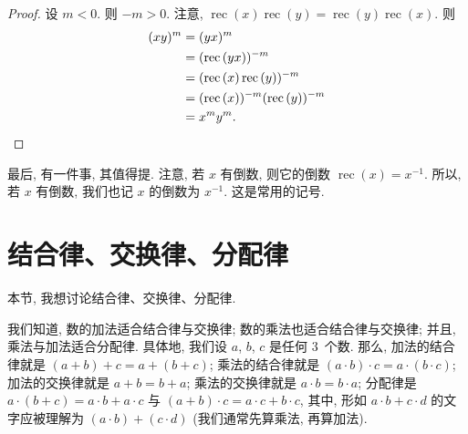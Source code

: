 \documentclass[../libro.tex]{subfiles}
\begin{document}
\begin{proof}
    设 \(m < 0\).
    则 \(-m > 0\).
    注意,
    \(\operatorname{rec} {(x)} \operatorname{rec} {(y)}
    = \operatorname{rec} {(y)} \operatorname{rec} {(x)}\).
    则
    \begin{align*}
        (x y)^m
        = {} &
        (y x)^m
        \\
        = {} &
        (\operatorname{rec} {(y x)})^{-m}
        \\
        = {} &
        (\operatorname{rec} {(x)} \operatorname{rec} {(y)})^{-m}
        \\
        = {} &
        (\operatorname{rec} {(x)})^{-m} (\operatorname{rec} {(y)})^{-m}
        \\
        = {} &
        x^m y^m.
        \qedhere
    \end{align*}
\end{proof}

最后, 有一件事, 其值得提.
注意, 若 \(x\) 有倒数, 则它的倒数
\(\operatorname{rec} {(x)} = x^{-1}\).
所以, 若 \(x\) 有倒数,
我们也记 \(x\) 的倒数为 \(x^{-1}\).
这是常用的记号.

\section{结合律、交换律、分配律}

本节, 我想讨论结合律、交换律、分配律.

我们知道, 数的加法适合结合律与交换律;
数的乘法也适合结合律与交换律;
并且, 乘法与加法适合分配律.
具体地, 我们设 \(a\), \(b\), \(c\) 是任何 \(3\)~个数.
那么, 加法的结合律就是 \((a + b) + c = a + (b + c)\);
乘法的结合律就是 \((a \cdot b) \cdot c = a \cdot (b \cdot c)\);
加法的交换律就是 \(a + b = b + a\);
乘法的交换律就是 \(a \cdot b = b \cdot a\);
分配律是
\(a \cdot (b + c) = a \cdot b + a \cdot c\)
与
\((a + b) \cdot c = a \cdot c + b \cdot c\),
其中, 形如 \(a \cdot b + c \cdot d\)
的文字应被理解为
\((a \cdot b) + (c \cdot d)\)
(我们通常先算乘法, 再算加法).

\end{document}
